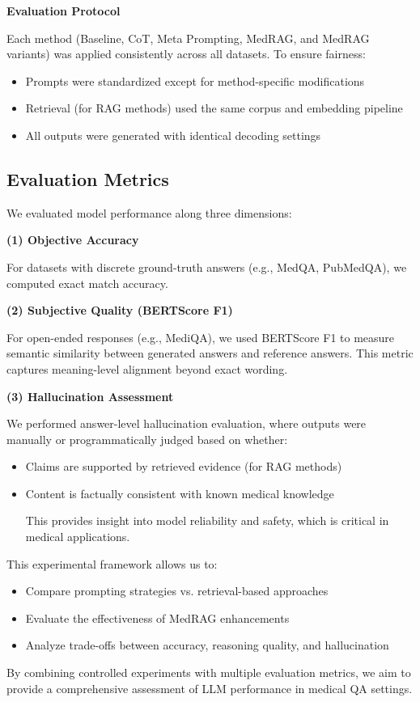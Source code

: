 \documentclass{article}
\begin{document}
\textbf{Evaluation Protocol}

 Each method (Baseline, CoT, Meta Prompting, MedRAG, and MedRAG variants) was applied consistently across all datasets. To ensure fairness:

\begin{itemize}
    \item Prompts were standardized except for method-specific modifications 
    \item Retrieval (for RAG methods) used the same corpus and embedding pipeline 
    \item All outputs were generated with identical decoding settings
\end{itemize}


\subsection{Evaluation Metrics}

We evaluated model performance along three dimensions:

\textbf{(1) Objective Accuracy}

 For datasets with discrete ground-truth answers (e.g., MedQA, PubMedQA), we computed exact match accuracy.

\textbf{(2) Subjective Quality (BERTScore F1)}

 For open-ended responses (e.g., MediQA), we used BERTScore F1 to measure semantic similarity between generated answers and reference answers. This metric captures meaning-level alignment beyond exact wording.

\textbf{(3) Hallucination Assessment}

 We performed answer-level hallucination evaluation, where outputs were manually or programmatically judged based on whether:

\begin{itemize}
    \item Claims are supported by retrieved evidence (for RAG methods) 
    \item Content is factually consistent with known medical knowledge

 This provides insight into model reliability and safety, which is critical in medical applications.
\end{itemize}


This experimental framework allows us to:

\begin{itemize}
    \item Compare prompting strategies vs. retrieval-based approaches 
    \item Evaluate the effectiveness of MedRAG enhancements 
    \item Analyze trade-offs between accuracy, reasoning quality, and hallucination 
\end{itemize}
By combining controlled experiments with multiple evaluation metrics, we aim to provide a comprehensive assessment of LLM performance in medical QA settings.
\end{document}
